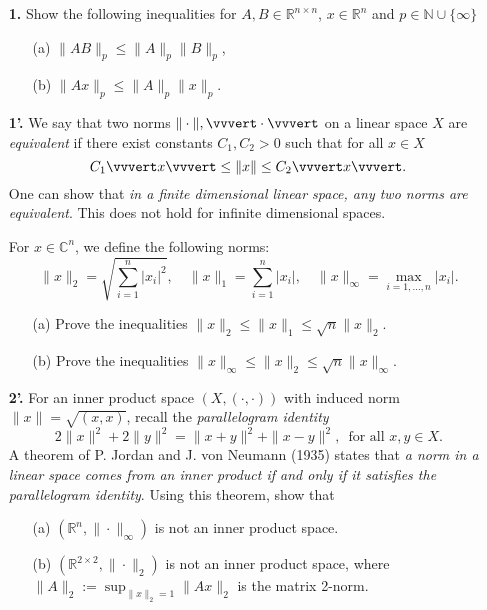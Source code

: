 \documentclass[10pt]{report}
\begin{document}
\begin{enumerate}
  \item[\textbf{1.}]Show the following inequalities for $A,
  B\in\mathbb{R}^{n\times n}$, $x\in\mathbb{R}^n$ and 
  $p\in\mathbb{N}\cup\{\infty\}$
\begin{enumerate}
  \item[(a)]$\|AB\|_p\leq\|A\|_p\|B\|_p$,
  \item[(b)]$\|Ax\|_p\leq\|A\|_p\|x\|_p$.
\end{enumerate}

\vspace{0.7cm}


\item[\textbf{1'.}]
We say that two norms $\| \cdot \|, \vvvert \cdot \vvvert$ on a linear space $X$ are \textit{equivalent} if there exist constants $C_1, C_2 > 0$ such that for all $x \in X$
\[C_1 \vvvert x \vvvert \leq \|x\| \leq  C_2\vvvert x\vvvert.\]
One can show that \textit{in a finite dimensional linear space, any two norms are equivalent}. This does not hold for infinite dimensional spaces.

For $x \in \mathbb{C}^{n}$, we define the following norms: 
\[
\|x\|_2 =\sqrt{\sum_{i=1}^n |x_i|^2},\quad
\|x\|_1 = \sum_{i=1}^n |x_i|,\quad
\|x\|_{\infty} = \max_{i=1, \ldots,n}|x_i|.
\]

\begin{enumerate}
  \item[(a)]Prove the inequalities  $\|x\|_2 \leq \|x\|_1 \leq \sqrt{n}\|x\|_2$.
  \item[(b)]Prove the inequalities  $ \|x\|_\infty \leq \|x\|_2 \leq  \sqrt{n}\|x\|_{\infty}$.
\end{enumerate}


\item[\textbf{2'.}] For an inner product space $(X, (\cdot, \cdot))$ with induced norm $\|x\|= \sqrt{(x, x)}$, recall  the \textit{parallelogram identity}
\[2 \|x\|^2 + 2\|y\|^2 = \|x+y\|^2 + \|x-y\|^2, \, \text{ for all } x,y \in X.\]
A theorem of P. Jordan and J. von Neumann (1935) states that \textit{a norm in a linear space comes from an inner product if and only if it satisfies the parallelogram identity}. Using this theorem, show that

\begin{enumerate}
  \item[(a)] $(\mathbb{R}^n, \| \cdot \|_\infty)$ is not an inner product space.
  \item[(b)] $(\mathbb{R}^{2 \times 2}, \| \cdot \|_2)$ is not an inner product space, where $\|A\|_2:= \sup_{\|x\|_2=1} \|Ax\|_2$ is the matrix 2-norm.


\end{enumerate}
\end{enumerate}
\end{document}
